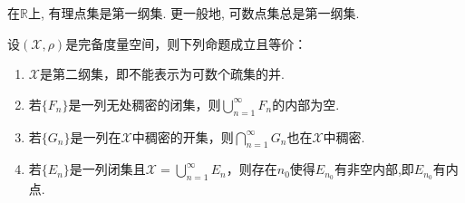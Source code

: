 \documentclass[../../main.tex]{subfiles}%
\begin{document}
\begin{examples}
在$\mathbb{R}$上, 有理点集是第一纲集. 更一般地, 可数点集总是第一纲集.
\end{examples}

\begin{theorem}[Baire纲定理]\label{theorem:泛函分析--Baire纲定理}
设$(\mathscr{X},\rho)$是完备度量空间，则下列命题成立且等价：
\begin{enumerate}[(1)]
\item $\mathscr{X}$是第二纲集，即不能表示为可数个疏集的并.
\item 若$\{F_n\}$是一列无处稠密的闭集，则$\bigcup\limits_{n=1}^{\infty}F_n$的内部为空.
\item 若$\{G_n\}$是一列在$\mathscr{X}$中稠密的开集，则$\bigcap\limits_{n=1}^{\infty}G_n$也在$\mathscr{X}$中稠密.
\item 若$\{E_n\}$是一列闭集且$\mathscr{X}=\bigcup\limits_{n=1}^{\infty}E_n$，则存在$n_0$使得$E_{n_0}$有非空内部,即$E_{n_0}$有内点.
\end{enumerate}
\end{theorem}
\end{document}
